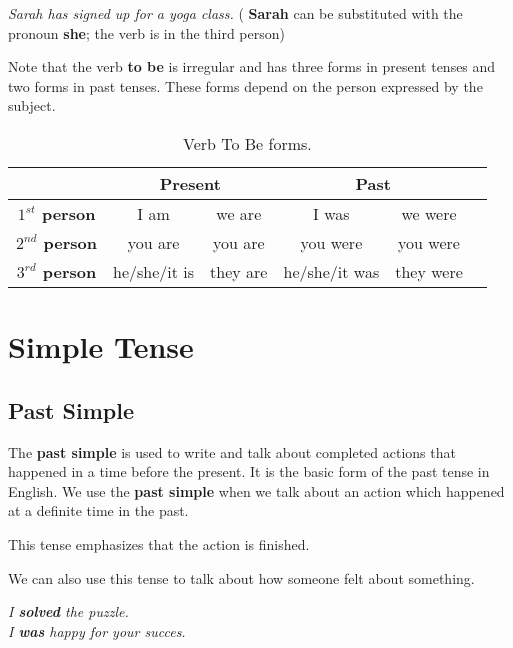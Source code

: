 \documentclass[hidelinks,10pt,a4paper]{article}
\begin{document}
\begin{center}
	\textit{Sarah has signed up for a yoga class.} ( \textbf{Sarah} can be substituted with the pronoun \textbf{she}; the verb is in the third person)
 \end{center}

Note that the verb \textbf{to be} is irregular and has three forms in present tenses and two forms in past tenses. These forms depend on the person expressed by the subject.

\begin{table}[h]
	\begin{center}
	\begin{tabular}{|c|c|c|c|c|c}
		\hline
		 & \multicolumn{2}{|c|}{ \textbf{Present}} & \multicolumn{2}{|c|}{ \textbf{Past}} \\ \hline
		\textbf{$1^{st}$ person} & I am & we are & I was & we were \\ \hline
		\textbf{$2^{nd}$ person} & you are & you are & you were & you were \\ \hline
		\textbf{$3^{rd}$ person} & he/she/it is & they are & he/she/it was & they were \\ \hline
	\end{tabular}
\end{center}
\caption{\label{tab:vrbcjg2}Verb To Be forms.}
\end{table}

\section{Simple Tense}
\subsection{Past Simple}
The \textbf{past simple} is used to write and talk about completed actions that happened in a time before the present. It is the basic form of the past tense in English. We use the \textbf{past simple} when we talk about an action which happened at a definite time in the past.

This tense emphasizes that the action is finished.

We can also use this tense to talk about how someone felt about something.

\begin{center}
	\textit{I \textbf{solved} the puzzle. \\
	I \textbf{was} happy for your succes.}
\end{center}
\end{document}
